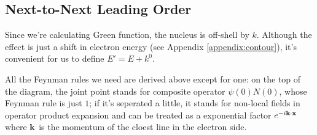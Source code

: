 \documentclass[aps,prd,preprint,showkeys,notitlepage,10pt]{revtex4-1}
\newcommand{\vbk}{\vb{k}}
\begin{document}
\subsection{Next-to-Next Leading Order}
Since we're calculating Green function, the nucleus is off-shell by $k$. Although the effect is just a shift in electron energy (see Appendix \ref{appendix:contour}), it's convenient for us to define $E'=E+k^0$.

All the Feynman rules we need are derived above except for one: on the top of the diagram, the joint point stands for composite operator $\psi(0)N(0)$, whose Feynman rule is just $1$; if it's seperated a little, it stands for non-local fields in operator product expansion and can be treated as a exponential factor $e^{-i \vbk \cdot \vb{x}}$ where $\vbk$ is the momentum of the cloest line in the electron side.
\end{document}
